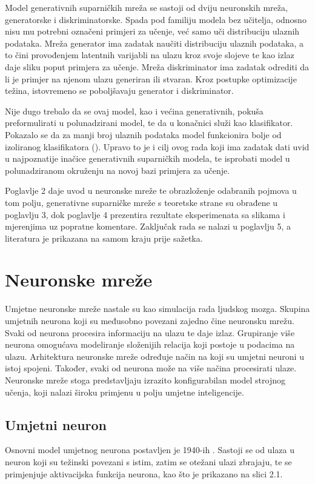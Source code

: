 \documentclass[times, utf8, diplomski]{fer}
\begin{document}
Model generativnih suparničkih mreža se sastoji od dviju neuronskih mreža, generatorske i diskriminatorske. Spada pod familiju modela bez učitelja, odnosno nisu mu potrebni označeni primjeri za učenje, već samo uči distribuciju ulaznih podataka. Mreža generator ima zadatak naučiti distribuciju ulaznih podataka, a to čini provođenjem latentnih varijabli na ulazu kroz svoje slojeve te kao izlaz daje sliku poput primjera za učenje. Mreža diskriminator ima zadatak odrediti da li je primjer na njenom ulazu generiran ili stvaran. Kroz postupke optimizacije težina, istovremeno se poboljšavaju generator i diskriminator. \par

Nije dugo trebalo da se ovaj model, kao i većina generativnih, pokuša preformulirati u polunadzirani model, te da u konačnici služi kao klasifikator. Pokazalo se da za manji broj ulaznih podataka model funkcionira bolje od izoliranog klasifikatora (\cite{odena}). Upravo to je i cilj ovog rada koji ima zadatak dati uvid u najpoznatije inačice generativnih suparničkih modela, te isprobati model u polunadziranom okruženju na novoj bazi primjera za učenje. \par

Poglavlje 2 daje uvod u neuronske mreže te obrazloženje odabranih pojmova u tom polju, generativne suparničke mreže s teoretske strane su obrađene u poglavlju 3, dok poglavlje 4 prezentira rezultate eksperimenata sa slikama i mjerenjima uz popratne komentare. Zaključak rada se nalazi u poglavlju 5, a literatura je prikazana na samom kraju prije sažetka. \par

\chapter{Neuronske mreže}
Umjetne neuronske mreže nastale su kao simulacija rada ljudskog mozga. Skupina umjetnih neurona koji su međusobno povezani zajedno čine neuronsku mrežu. Svaki od neurona procesira informaciju na ulazu te daje izlaz. Grupiranje više neurona omogućava modeliranje složenijih relacija koji postoje u podacima na ulazu. Arhitektura neuronske mreže određuje način na koji su umjetni neuroni u istoj spojeni. Također, svaki od neurona može na više načina procesirati ulaze. Neuronske mreže stoga predstavljaju izrazito konfigurabilan model strojnog učenja, koji nalazi široku primjenu u polju umjetne inteligencije.

\section{Umjetni neuron}
Osnovni model umjetnog neurona postavljen je 1940-ih \cite{mcculloch}. Sastoji se od ulaza u neuron koji su težinski povezani s istim, zatim se otežani ulazi zbrajaju, te se primjenjuje aktivacijska funkcija neurona, kao što je prikazano na slici 2.1. \par
\end{document}
